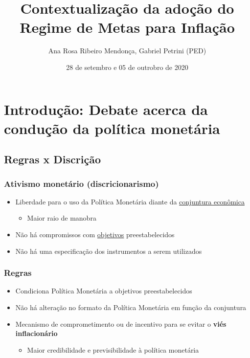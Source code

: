 \documentclass[11pt]{article}
\author{Ana Rosa Ribeiro Mendonça, Gabriel Petrini (PED)}
\date{28 de setembro  e 05 de outrobro de 2020}
\title{Contextualização da adoção do Regime de Metas para Inflação}
\begin{document}
\maketitle

\section*{Introdução: Debate acerca da condução da política monetária}
\label{sec:org7e08517}

\subsection*{Regras x Discrição}
\label{sec:orgd1eb54d}

\subsubsection*{Ativismo monetário (discricionarismo)}
\label{sec:org71c50ba}

\begin{itemize}
\item Liberdade para o uso da Política Monetária diante da \uline{conjuntura econômica}
\begin{itemize}
\item Maior raio de manobra
\end{itemize}
\item Não há compromissos com \uline{objetivos} preestabelecidos
\item Não há uma especificação dos instrumentos a serem utilizados
\end{itemize}

\subsubsection*{Regras}
\label{sec:org9080a4f}

\begin{itemize}
\item Condiciona Política Monetária a objetivos preestabelecidos
\item Não há alteração no formato da Política Monetária em função da conjuntura
\item Mecanismo de comprometimento ou de incentivo para se evitar o \textbf{viés inflacionário}
\begin{itemize}
\item Maior credibilidade e previsibilidade à política monetária
\end{itemize}
\end{itemize}
\end{document}
